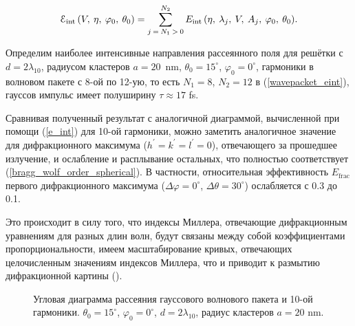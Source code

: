 
    \begin{equation}
        \EuScript{E}_{\textrm{int}} \left(V, \:\eta, \:\varphi_0, \:\theta_0 \right) = \sum\limits_{j\:=\:N_1\:>\:0}^{N_2}{E_{\textrm{int}} \left( \eta,\:\lambda_{j}, \:V, \:A_j, \:\varphi_0, \:\theta_0\right)}.
        \label{wavepacket_eint}
    \end{equation}

Определим наиболее интенсивные направления рассеянного поля для решётки с $d = 2\lambda_{10}$, радиусом кластеров $a = 20$~nm, $\theta_0 = 15^\circ$, $\varphi_0 = 0^\circ$, гармоники в волновом пакете с 8-ой по 12-ую, то есть $N_1 = 8$, $N_2 = 12$ в (\ref{wavepacket_eint}), гауссов импульс имеет полуширину $\tau \approx 17$ fs.

Сравнивая полученный результат с аналогичной диаграммой, вычисленной при помощи (\ref{e_int}) для 10-ой гармоники, можно заметить аналогичное значение для дифракционного максимума ($h^\prime = k^\prime = l^\prime = 0$), отвечающего за прошедшее излучение, и ослабление и расплывание остальных, что полностью соответствует (\ref{bragg_wolf_order_spherical}). В частности, относительная эффективность $E_{\textrm{frac}}$ первого дифракционного максимума ($\Delta \varphi = 0^\circ$, $\Delta \theta = 30^\circ$) ослабляется с 0.3 до 0.1.

Это происходит в силу того, что индексы Миллера, отвечающие дифракционным уравнениям для разных длин волн, будут связаны между собой коэффициентами пропорциональности, имеем масштабирование кривых, отвечающих целочисленным значениям индексов Миллера, что и приводит к размытию дифракционной картины ().

    \begin{figure}[ht]
        \hfil
        \caption{Угловая диаграмма рассеяния гауссового волнового пакета и 10-ой гармоники. $\theta_0 = 15^\circ$, $\varphi_0 = 0^\circ$, $d = 2\lambda_{10}$, радиус кластеров $a = 20$ nm.}\label{wavepacket1:image}
    \end{figure}
